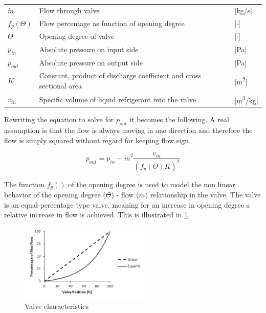 \begin{center}
	\begin{tabular}{l p{8cm} l}
		$\dot{m}$     & Flow through valve                                                  & [\si{kg}/\si{s}]   \\
		$f_p(\Theta)$ & Flow percentage as function of opening degree                       & [$\cdot$]          \\
		$ \Theta $    & Opening degree of valve                                             & [$ \cdot $]        \\
		$p_{in}$      & Absolute pressure on input side                                     & [\si{Pa}]          \\
		$p_{out}$     & Absolute pressure on output side                                    & [\si{Pa}]          \\
		$K$           & Constant, product of discharge coefficient and cross sectional area & [\si{m^2}]         \\
		$v_{in}$      & Specific volume of liquid refrigerant into the valve                & [\si{m^3}/\si{kg}]
	\end{tabular}
\end{center}

Rewriting the equation to solve for $p_{out}$ it becomes the following. A real assumption is that the flow is always moving in one direction and therefore the flow is simply squared without regard for keeping flow sign.

\begin{equation}
	p_{out} = p_{in} - \dot{m}^2 \dfrac{v_{in}}{(f_p(\Theta) K)^2}
\end{equation}

The function $f_p()$ of the opening degree is used to model the non linear behavior of the opening degree ($ \Theta $) - flow ($ \dot{m} $) relationship in the valve. The valve is an equal-percentage type valve, meaning for an increase in opening degree a relative increase in flow is achieved. This is illustrated in \cref{fig:equal_percent_valve}.

\begin{figure}[h!]
	\centering
	\includegraphics[width=0.55\textwidth]{Graphics/Equal-percentage.png}
	\caption{Valve characteristics}
	\label{fig:equal_percent_valve}
\end{figure}


